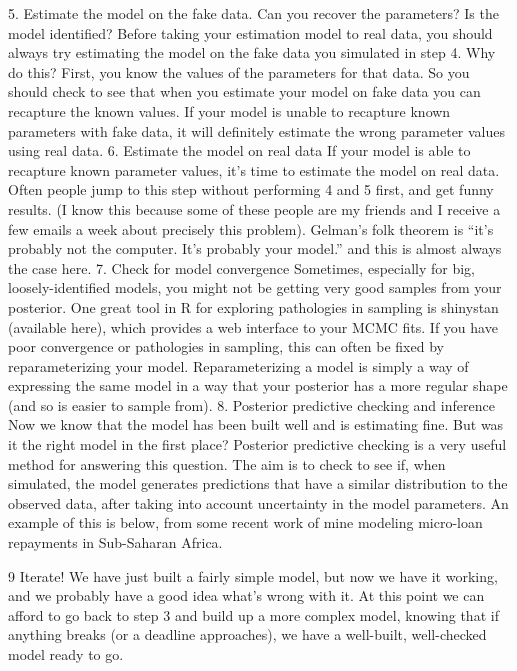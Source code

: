 5. Estimate the model on the fake data. Can you recover the parameters? Is the model identified?
Before taking your estimation model to real data, you should always try estimating the model on the fake data you simulated in step 4. Why do this? First, you know the values of the parameters for that data. So you should check to see that when you estimate your model on fake data you can recapture the known values. If your model is unable to recapture known parameters with fake data, it will definitely estimate the wrong parameter values using real data.
6. Estimate the model on real data
If your model is able to recapture known parameter values, it’s time to estimate the model on real data.
Often people jump to this step without performing 4 and 5 first, and get funny results. (I know this because some of these people are my friends and I receive a few emails a week about precisely this problem). Gelman’s folk theorem is “it’s probably not the computer. It’s probably your model.” and this is almost always the case here.
7. Check for model convergence
Sometimes, especially for big, loosely-identified models, you might not be getting very good samples from your posterior. One great tool in R for exploring pathologies in sampling is shinystan (available here), which provides a web interface to your MCMC fits.
If you have poor convergence or pathologies in sampling, this can often be fixed by reparameterizing your model. Reparameterizing a model is simply a way of expressing the same model in a way that your posterior has a more regular shape (and so is easier to sample from).
8. Posterior predictive checking and inference
Now we know that the model has been built well and is estimating fine. But was it the right model in the first place? Posterior predictive checking is a very useful method for answering this question. The aim is to check to see if, when simulated, the model generates predictions that have a similar distribution to the observed data, after taking into account uncertainty in the model parameters.
An example of this is below, from some recent work of mine modeling micro-loan repayments in Sub-Saharan Africa.




9 Iterate!
We have just built a fairly simple model, but now we have it working, and we probably have a good idea what’s wrong with it. At this point we can afford to go back to step 3 and build up a more complex model, knowing that if anything breaks (or a deadline approaches), we have a well-built, well-checked model ready to go. 



